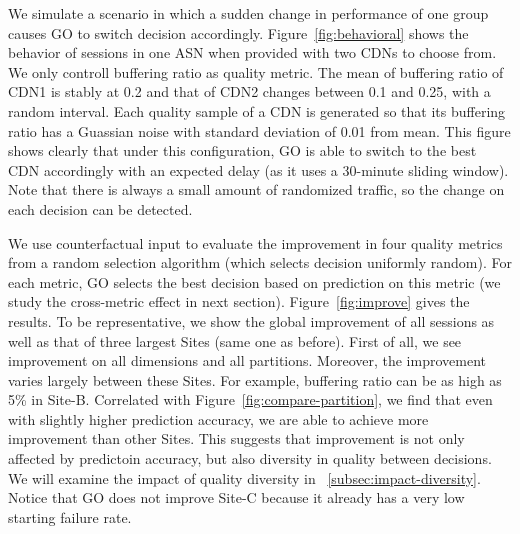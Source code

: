  We simulate a scenario in which a sudden change in performance of one group causes GO to switch decision accordingly. Figure~\ref{fig:behavioral} shows the behavior of sessions in one ASN when provided with two CDNs to choose from. We only controll buffering ratio as quality metric. The mean of buffering ratio of CDN1 is stably at 0.2 and that of CDN2 changes between 0.1 and 0.25, with a random interval. Each quality sample of a CDN is generated so that its buffering ratio has a Guassian noise with standard deviation of 0.01 from mean. This figure shows clearly that under this configuration, GO is able to switch to the best CDN accordingly with an expected delay (as it uses a 30-minute sliding window). Note that there is always a small amount of randomized traffic, so the change on each decision can be detected. %




\label{subsec:go-improve}
We use counterfactual input to evaluate the improvement in four quality metrics from a random selection algorithm (which selects decision uniformly random). For each metric, GO selects the best decision based on prediction on this metric (we study the cross-metric effect in next section). Figure~\ref{fig:improve} gives the results. To be representative, we show the global improvement of all sessions as well as that of three largest Sites (same one as before). First of all, we see improvement on all dimensions and all partitions. Moreover, the improvement varies largely between these Sites. For example, buffering ratio can be as high as 5\% in Site-B. Correlated with Figure~\ref{fig:compare-partition}, we find that even with slightly higher prediction accuracy, we are able to achieve more improvement than other Sites. This suggests that improvement is not only affected by predictoin accuracy, but also diversity in quality between decisions. We will examine the impact of quality diversity in \Section~\ref{subsec:impact-diversity}.
Notice that GO does not improve Site-C because it already has a very low starting failure rate.



